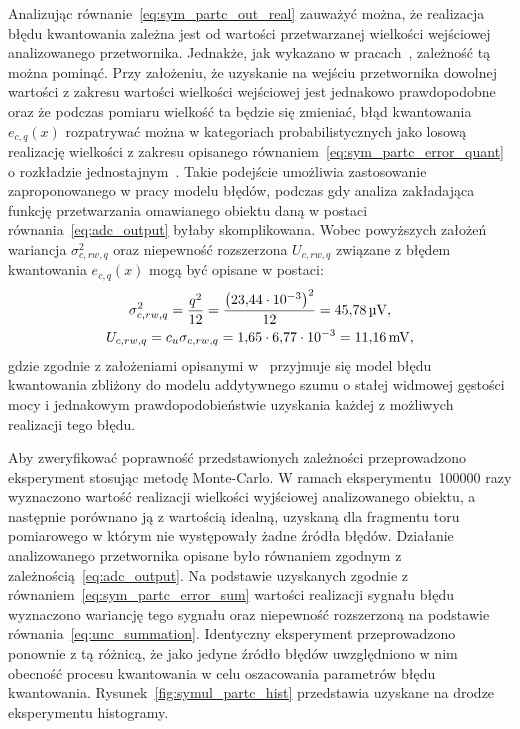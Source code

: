 Analizując równanie~\eqref{eq:sym_partc_out_real} zauważyć można, że realizacja błędu kwantowania zależna jest od wartości przetwarzanej wielkości wejściowej analizowanego przetwornika. Jednakże, jak wykazano w pracach~\cite{sienkowski_kwant, sienkowski_adc}, zależność tą można pominąć. Przy założeniu, że uzyskanie na wejściu przetwornika dowolnej wartości z zakresu wartości wielkości wejściowej jest jednakowo prawdopodobne oraz że podczas pomiaru wielkość ta będzie się zmieniać, błąd kwantowania $e_{c,q}(x)$ rozpatrywać można w kategoriach probabilistycznych jako losową realizację wielkości z zakresu opisanego równaniem~\eqref{eq:sym_partc_error_quant} o rozkładzie jednostajnym~\cite{jakubiec_system}. Takie podejście umożliwia zastosowanie zaproponowanego w pracy modelu błędów, podczas gdy analiza zakładająca funkcję przetwarzania omawianego obiektu daną w postaci równania~\eqref{eq:adc_output} byłaby skomplikowana. Wobec powyższych założeń wariancja $\sigma_{c,rw,q}^{2}$ oraz niepewność rozszerzona $U_{c,rw,q}$ związane z błędem kwantowania $e_{c,q}(x)$ mogą być opisane w postaci:
\begin{gather}
\sigma_{c,rw,q}^{2} = \frac{ q^{2}}{12} = \frac{\left(\num{23.44e-3}\right)^{2} }{12} = \qty{45.78}{\micro V} \label{eq:sym_partc_var_quant}, \\
U_{c,rw,q} = c_{u} \sigma_{c,rw,q} = \num{1.65} \cdot \num{6.77e-3} = \qty{11.16}{mV} \label{eq:sym_partc_uncert_quant},
\end{gather}
gdzie zgodnie z założeniami opisanymi w~\cite{gray_quantization, widrow_quantization} przyjmuje się model błędu kwantowania zbliżony do modelu addytywnego szumu o stałej widmowej gęstości mocy i jednakowym prawdopodobieństwie uzyskania każdej z możliwych realizacji tego błędu.

Aby zweryfikować poprawność przedstawionych zależności przeprowadzono eksperyment stosując metodę Monte-Carlo. W ramach eksperymentu~\num{100000} razy wyznaczono wartość realizacji wielkości wyjściowej analizowanego obiektu, a następnie porównano ją z wartością idealną, uzyskaną dla fragmentu toru pomiarowego w którym nie występowały żadne źródła błędów. Działanie analizowanego przetwornika opisane było równaniem zgodnym z zależnością~\eqref{eq:adc_output}. Na podstawie uzyskanych zgodnie z równaniem~\eqref{eq:sym_partc_error_sum} wartości realizacji sygnału błędu wyznaczono wariancję tego sygnału oraz niepewność rozszerzoną na podstawie równania~\eqref{eq:unc_summation}. Identyczny eksperyment przeprowadzono ponownie z tą różnicą, że jako jedyne źródło błędów uwzględniono w nim obecność procesu kwantowania w celu oszacowania parametrów błędu kwantowania. Rysunek~\ref{fig:symul_partc_hist} przedstawia uzyskane na drodze eksperymentu histogramy.

